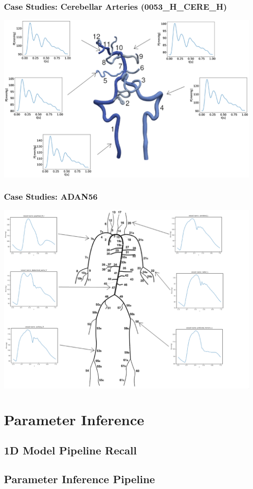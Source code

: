 \documentclass[compress]{beamer}
\begin{document}
\begin{frame}
	\frametitle{Case Studies: Cerebellar Arteries (0053\_H\_CERE\_H)}
	\includegraphics[width=\columnwidth]{images/0053.eps}
\end{frame}
\begin{frame}
	\frametitle{Case Studies: ADAN56}
	\includegraphics[width=\textwidth]{images/adan56.eps}
\end{frame}

\section{Parameter Inference}
\subsection{1D Model Pipeline Recall}
\subsection{Parameter Inference Pipeline}
\end{document}
